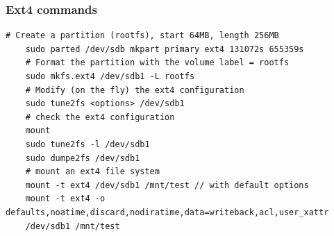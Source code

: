 \documentclass[resume]{subfiles}
\begin{document}
\subsubsection{Ext4 commands}
\begin{lstlisting}[style=bash,label={},caption={}]
    # Create a partition (rootfs), start 64MB, length 256MB
    sudo parted /dev/sdb mkpart primary ext4 131072s 655359s
    # Format the partition with the volume label = rootfs
    sudo mkfs.ext4 /dev/sdb1 -L rootfs
    # Modify (on the fly) the ext4 configuration
    sudo tune2fs <options> /dev/sdb1
    # check the ext4 configuration
    mount
    sudo tune2fs -l /dev/sdb1
    sudo dumpe2fs /dev/sdb1
    # mount an ext4 file system
    mount -t ext4 /dev/sdb1 /mnt/test // with default options
    mount -t ext4 -o defaults,noatime,discard,nodiratime,data=writeback,acl,user_xattr
    /dev/sdb1 /mnt/test
\end{lstlisting}
\end{document}
